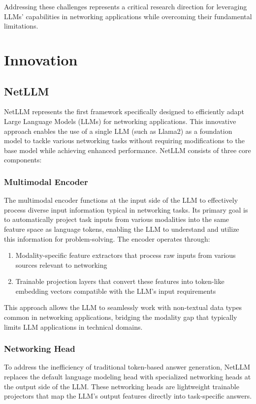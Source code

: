 \documentclass[twocolumn]{article}
\begin{document}
Addressing these challenges represents a critical research direction for leveraging LLMs' capabilities in networking applications while overcoming their fundamental limitations.

\section{Innovation}

\subsection{NetLLM}

NetLLM represents the first framework specifically designed to efficiently adapt Large Language Models (LLMs) for networking applications. This innovative approach enables the use of a single LLM (such as Llama2) as a foundation model to tackle various networking tasks without requiring modifications to the base model while achieving enhanced performance. NetLLM consists of three core components:

\subsubsection{Multimodal Encoder}
The multimodal encoder functions at the input side of the LLM to effectively process diverse input information typical in networking tasks. Its primary goal is to automatically project task inputs from various modalities into the same feature space as language tokens, enabling the LLM to understand and utilize this information for problem-solving. The encoder operates through:

\begin{enumerate}[itemsep=0pt, topsep=2pt, parsep=0pt]
  \item Modality-specific feature extractors that process raw inputs from various sources relevant to networking
  \item Trainable projection layers that convert these features into token-like embedding vectors compatible with the LLM's input requirements
\end{enumerate}

This approach allows the LLM to seamlessly work with non-textual data types common in networking applications, bridging the modality gap that typically limits LLM applications in technical domains.

\subsubsection{Networking Head}
To address the inefficiency of traditional token-based answer generation, NetLLM replaces the default language modeling head with specialized networking heads at the output side of the LLM. These networking heads are lightweight trainable projectors that map the LLM's output features directly into task-specific answers.
\end{document}

